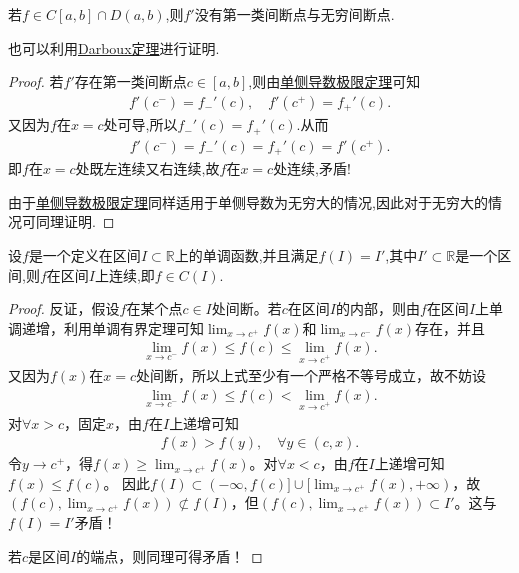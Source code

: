 \documentclass[../../main.tex]{subfiles}
\begin{document}
\begin{proposition}\label{proposition:导函数没有第一类间断点与无穷间断点}
若$f\in C[a,b]\cap D(a,b)$,则$f'$没有第一类间断点与无穷间断点.
\end{proposition}
\begin{remark}
也可以利用\hyperref[theorem:导数介值定理]{Darboux定理}进行证明.
\end{remark}
\begin{proof}
若$f'$存在第一类间断点$c\in [a,b]$,则由\hyperref[theorem:单侧导数极限定理]{单侧导数极限定理}可知
\begin{align*}
f' \left( c^- \right) =f_{-}'\left( c \right) ,\quad f' \left( c^+ \right) =f_{+}'\left( c \right) .
\end{align*}
又因为$f$在$x=c$处可导,所以$f_{-}'\left( c \right) =f_{+}'\left( c \right)$.从而\
\begin{align*}
f' \left( c^- \right) =f_{-}'\left( c \right) =f_{+}'\left( c \right) =f'\left( c^+ \right) .
\end{align*}
即$f$在$x=c$处既左连续又右连续,故$f$在$x=c$处连续,矛盾!

由于\hyperref[theorem:单侧导数极限定理]{单侧导数极限定理}同样适用于单侧导数为无穷大的情况,因此对于无穷大的情况可同理证明.
\end{proof}

\begin{proposition}\label{proposition:定义是区间的单调函数值域还是区间就必是连续函数}
设$f$是一个定义在区间$I\subset \mathbb{R}$上的单调函数,并且满足$f(I)=I'$,其中$I'\subset \mathbb{R}$是一个区间,则$f$在区间$I$上连续,即$f\in C(I)$.
\end{proposition}
\begin{proof}
反证，假设$f$在某个点$c\in I$处间断。若$c$在区间$I$的内部，则由$f$在区间$I$上单调递增，利用单调有界定理可知$\lim_{x\rightarrow c^+}f(x)$和$\lim_{x\rightarrow c^-}f(x)$存在，并且
\begin{align*}
\lim_{x\rightarrow c^-}f(x) \leqslant f(c) \leqslant \lim_{x\rightarrow c^+}f(x).
\end{align*}
又因为$f(x)$在$x=c$处间断，所以上式至少有一个严格不等号成立，故不妨设
\begin{align*}
\lim_{x\rightarrow c^-}f(x) \leqslant f(c) < \lim_{x\rightarrow c^+}f(x).
\end{align*}
对$\forall x>c$，固定$x$，由$f$在$I$上递增可知
\begin{align*}
f(x) > f(y), \quad \forall y \in (c, x).
\end{align*}
令$y\rightarrow c^+$，得$f(x) \geqslant \lim_{x\rightarrow c^+}f(x)$。对$\forall x<c$，由$f$在$I$上递增可知$f(x) \leqslant f(c)$。
因此$f(I) \subset (-\infty, f(c)] \cup [\lim_{x\rightarrow c^+}f(x), +\infty)$，故$(f(c), \lim_{x\rightarrow c^+}f(x)) \not\subset f(I)$，但$(f(c), \lim_{x\rightarrow c^+}f(x)) \subset I'$。这与$f(I) = I'$矛盾！

若$c$是区间$I$的端点，则同理可得矛盾！
\end{proof}
\end{document}

